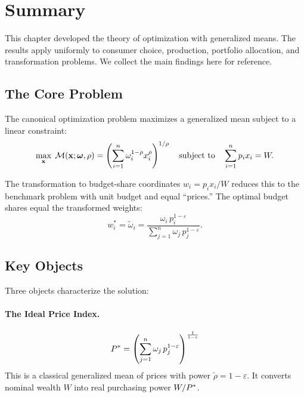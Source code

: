 
\section{Summary}
\label{sec:canonical-summary}

This chapter developed the theory of optimization with generalized means. The results apply uniformly to consumer choice, production, portfolio allocation, and transformation problems. We collect the main findings here for reference.

\subsection{The Core Problem}
\label{subsec:summary-core}

The canonical optimization problem maximizes a generalized mean subject to a linear constraint:
\begin{equation}
\max_{\mathbf{x}} \; \mathcal{M}(\mathbf{x}; \boldsymbol{\omega}, \rho) = \left( \sum_{i=1}^{n} \omega_i^{1-\rho} x_i^\rho \right)^{1/\rho} \quad \text{subject to} \quad \sum_{i=1}^{n} p_i x_i = W.
\end{equation}

The transformation to budget-share coordinates $w_i = p_i x_i / W$ reduces this to the benchmark problem with unit budget and equal ``prices.'' The optimal budget shares equal the transformed weights:
\begin{equation}
w_i^* = \tilde{\omega}_i = \frac{\omega_i \, p_i^{1-\varepsilon}}{\sum_{j=1}^{n} \omega_j \, p_j^{1-\varepsilon}}.
\end{equation}

\subsection{Key Objects}
\label{subsec:summary-objects}

Three objects characterize the solution:

\paragraph{The Ideal Price Index.}
\begin{equation}
P^{*} = \left( \sum_{j=1}^{n} \omega_j \, p_j^{1-\varepsilon} \right)^{\frac{1}{1-\varepsilon}}
\end{equation}
This is a classical generalized mean of prices with power $\tilde{\rho} = 1 - \varepsilon$. It converts nominal wealth $W$ into real purchasing power $W/P^{*}$.


